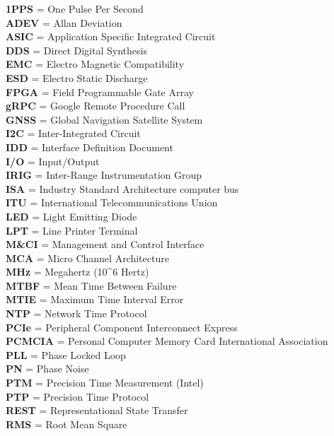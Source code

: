 \textbf{1PPS} = One Pulse Per Second\\
\textbf{ADEV} = Allan Deviation\\
\textbf{ASIC} = Application Specific Integrated Circuit\\
\textbf{DDS} = Direct Digital Synthesis\\
\textbf{EMC} = Electro Magnetic Compatibility\\
\textbf{ESD} = Electro Static Discharge\\
\textbf{FPGA} = Field Programmable Gate Array\\
\textbf{gRPC} = Google Remote Procedure Call\\
\textbf{GNSS} = Global Navigation Satellite System\\
\textbf{I2C} = Inter-Integrated Circuit\\
\textbf{IDD} = Interface Definition Document\\
\textbf{I/O} = Input/Output\\
\textbf{IRIG} = Inter-Range Instrumentation Group\\
\textbf{ISA} = Industry Standard Architecture computer bus\\
\textbf{ITU} = International Telecommunications Union\\
\textbf{LED} = Light Emitting Diode\\
\textbf{LPT} = Line Printer Terminal\\
\textbf{M\&CI} = Management and Control Interface\\
\textbf{MCA} = Micro Channel Architecture\\
\textbf{MHz} = Megahertz (10\^{}6 Hertz)\\
\textbf{MTBF} = Mean Time Between Failure\\
\textbf{MTIE} = Maximum Time Interval Error\\
\textbf{NTP} = Network Time Protocol\\
\textbf{PCIe} = Peripheral Component Interconnect Express\\
\textbf{PCMCIA} = Personal Computer Memory Card International
Association\\
\textbf{PLL} = Phase Locked Loop\\
\textbf{PN} = Phase Noise\\
\textbf{PTM} = Precision Time Measurement (Intel)\\
\textbf{PTP} = Precision Time Protocol\\
\textbf{REST} = Representational State Transfer\\
\textbf{RMS} = Root Mean Square\\
